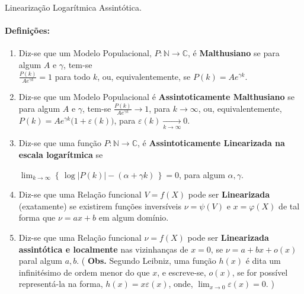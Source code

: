 \question
Linearização Logarítmica Assintótica.
\paragraph{Definições:}
\begin{enumerate}[(\bfseries D1)]
	\item Diz-se que um Modelo Populacional, $ P \colon \mathbb{N} \to \mathbb{C} $,
  é \textbf{Malthusiano} se para algum $ A $ e $ \gamma $, tem-se \\
  $ \displaystyle \frac{P(k)}{Ae^{\gamma k}} = 1 $ para todo $ k $, ou, 
  equivalentemente, se $ \displaystyle P(k) = Ae^{\gamma k} $.
 \item Diz-se que um Modelo Populacional é \textbf{Assintoticamente Malthusiano} 
  se para algum $ A $ e $ \gamma $, tem-se 
  $ \displaystyle \frac{P(k)}{Ae^{\gamma k}} \to 1 $,
  para $ k \to \infty $, ou, equivalentemente, 
  $ \displaystyle P(k) = Ae^{\gamma k} \big(1 + \varepsilon(k)\big) $, para 
  $\varepsilon(k) \underset{k \to \infty}{\to} 0 $.
 \item Diz-se que uma função $ P \colon  \mathbb{N} \to \mathbb{C} $, é 
  \textbf{Assintoticamente Linearizada na escala logarítmica} se 
  
  $
   \displaystyle \lim_{k \to \infty} 
   \left\{\,
    \log{\vert P(k) \vert - (\alpha + \gamma k)} 
   \,\right\}
   = 0
  $,
  para algum $\alpha, \gamma$.
 \item Diz-se que uma Relação funcional $ V = f(X) $ pode ser 
  \textbf{Linearizada} (exatamente) se existirem funções inversíveis 
  $ \nu = \psi{(V)} $ e $ x = \varphi{(X)} $ de tal forma que $ \nu = ax + b $
  em algum domínio.
 \item Diz-se que uma Relação funcional $ \nu = f(X) $ pode ser 
  \textbf{Linearizada assintótica e localmente} nas vizinhanças de 
  $ x = 0 $, se $ \nu = a + bx + o(x) $ paral algum $ a, b$. 
  (
  \textbf{Obs.} 
  Segundo Leibniz, uma função $ h(x) $ é dita um infinitésimo de ordem menor do 
  que $ x $, e escreve-se, $ o(x) $, se for possível representá-la na forma,
  $ h(x) = x \varepsilon{(x)} $, onde, 
  $ \displaystyle \lim_{x \to 0} \varepsilon{(x)} = 0$.
  )
\end{enumerate}


